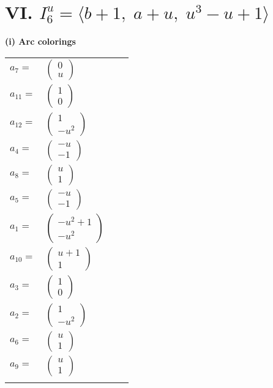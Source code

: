 \documentclass[1p]{elsarticle_modified}
\theoremstyle{definition}
\begin{document}
\centering \section*{VI. $I^u_{6}= \langle b+1,\;a+u,\;u^3- u+1 \rangle$}
\flushleft \textbf{(i) Arc colorings}\\
\begin{tabular}{m{7pt} m{180pt} m{7pt} m{180pt} }
\flushright $a_{7}=$&$\begin{pmatrix}0\\u\end{pmatrix}$ \\
\flushright $a_{11}=$&$\begin{pmatrix}1\\0\end{pmatrix}$ \\
\flushright $a_{12}=$&$\begin{pmatrix}1\\- u^2\end{pmatrix}$ \\
\flushright $a_{4}=$&$\begin{pmatrix}- u\\-1\end{pmatrix}$ \\
\flushright $a_{8}=$&$\begin{pmatrix}u\\1\end{pmatrix}$ \\
\flushright $a_{5}=$&$\begin{pmatrix}- u\\-1\end{pmatrix}$ \\
\flushright $a_{1}=$&$\begin{pmatrix}- u^2+1\\- u^2\end{pmatrix}$ \\
\flushright $a_{10}=$&$\begin{pmatrix}u+1\\1\end{pmatrix}$ \\
\flushright $a_{3}=$&$\begin{pmatrix}1\\0\end{pmatrix}$ \\
\flushright $a_{2}=$&$\begin{pmatrix}1\\- u^2\end{pmatrix}$ \\
\flushright $a_{6}=$&$\begin{pmatrix}u\\1\end{pmatrix}$ \\
\flushright $a_{9}=$&$\begin{pmatrix}u\\1\end{pmatrix}$\\&\end{tabular}
\end{document}
